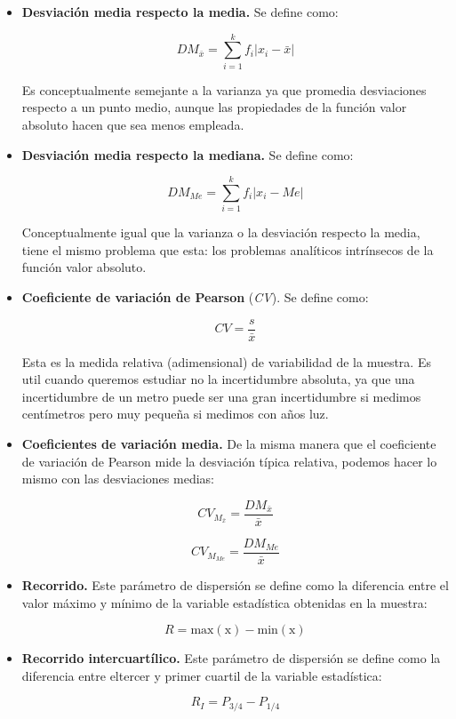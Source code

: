 \documentclass[12pt,a4paper]{book}
\begin{document}
\begin{itemize}
\item \textbf{Desviación media respecto la media.} Se define como:

\begin{equation}
D M_{\bar{x}} = \sum_{i=1}^k f_i |x_i - \bar{x}|
\end{equation}

Es conceptualmente semejante a la varianza ya que promedia desviaciones respecto a un punto medio, aunque las propiedades de la función valor absoluto hacen que sea menos empleada.

\item \textbf{Desviación media respecto la mediana.} Se define como:

\begin{equation}
D M_{Me} = \sum_{i=1}^k f_i |x_i - Me|
\end{equation}

Conceptualmente igual que la varianza o la desviación respecto la media, tiene el mismo problema que esta: los problemas analíticos intrínsecos de la función valor absoluto.


\item \textbf{Coeficiente de variación de Pearson} (\textit{CV}). Se define como:

\begin{equation}
CV = \dfrac{s}{\bar{x}}
\end{equation} 

Esta es la medida relativa (adimensional) de variabilidad de la muestra. Es util cuando queremos estudiar no la incertidumbre absoluta, ya que una incertidumbre de un metro puede ser una gran incertidumbre si medimos centímetros pero muy pequeña si medimos con años luz. 


\item \textbf{Coeficientes de variación media.} De la misma manera que el coeficiente de variación de Pearson mide la desviación típica relativa, podemos hacer lo mismo con las desviaciones medias:

\begin{equation}
CV_{M_{\bar{x}}} = \dfrac{DM_{\bar{x}}}{\bar{x}}
\end{equation}

\begin{equation}
CV_{M_{Me}} = \dfrac{DM_{Me}}{\bar{x}}
\end{equation}

\item \textbf{Recorrido.} Este parámetro de dispersión se define como la diferencia entre el valor máximo y mínimo de la variable estadística obtenidas en la muestra:

\begin{equation}
R = \mathrm{max(x)} - \mathrm{min(x)}
\end{equation}


\item \textbf{Recorrido intercuartílico.} Este parámetro de dispersión se define como la diferencia entre eltercer y primer cuartil de la variable estadística:

\begin{equation}
R_I = P_{3/4} - P_{1/4}
\end{equation}
\end{itemize}
\end{document}
